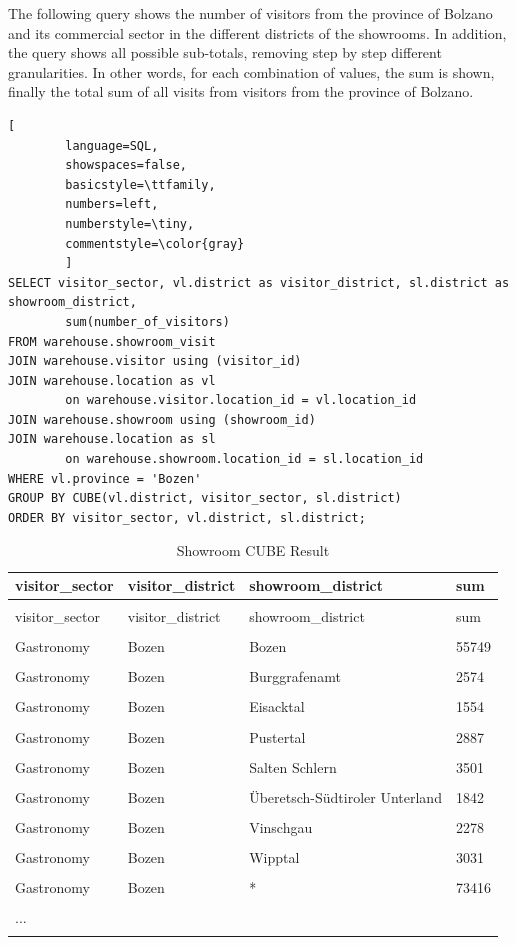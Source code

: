\documentclass[letterpaper,12pt]{article}
\begin{document}
The following query shows the number of visitors from the province of Bolzano and its commercial sector in the different districts of the showrooms. In addition, the query shows all possible sub-totals, removing step by step different granularities. In other words, for each combination of values, the sum is shown, finally the total sum of all visits from visitors from the province of Bolzano.

\begin{lstlisting}[
        language=SQL,
        showspaces=false,
        basicstyle=\ttfamily,
        numbers=left,
        numberstyle=\tiny,
        commentstyle=\color{gray}
        ]
SELECT visitor_sector, vl.district as visitor_district, sl.district as showroom_district, 
        sum(number_of_visitors)
FROM warehouse.showroom_visit
JOIN warehouse.visitor using (visitor_id)
JOIN warehouse.location as vl 
        on warehouse.visitor.location_id = vl.location_id 
JOIN warehouse.showroom using (showroom_id)
JOIN warehouse.location as sl 
        on warehouse.showroom.location_id = sl.location_id
WHERE vl.province = 'Bozen'
GROUP BY CUBE(vl.district, visitor_sector, sl.district)
ORDER BY visitor_sector, vl.district, sl.district;
\end{lstlisting}

\begingroup
\renewcommand\arraystretch{0.5}
\begin{longtable}{p{4cm}p{4cm}p{4cm}p{4cm}}
        \caption{Showroom CUBE Result} \\
				visitor\_sector & visitor\_district & showroom\_district & sum \\
        \endfirsthead \\
        visitor\_sector & visitor\_district & showroom\_district & sum \\
        \endhead \\
Gastronomy & Bozen & Bozen & 55749 \\
\hline \\
Gastronomy & Bozen & Burggrafenamt  & 2574 \\
\hline \\
Gastronomy & Bozen & Eisacktal & 1554 \\
\hline \\
Gastronomy & Bozen & Pustertal & 2887 \\
\hline \\
Gastronomy & Bozen & Salten Schlern & 3501 \\
\hline \\
Gastronomy & Bozen & Überetsch-Südtiroler Unterland & 1842 \\
\hline \\
Gastronomy & Bozen & Vinschgau & 2278 \\
\hline \\
Gastronomy & Bozen & Wipptal & 3031 \\
\hline \\
Gastronomy & Bozen & * & 73416 \\
\hline \\
... \\
\hline \\
\end{longtable} 
\endgroup    
\end{document}
